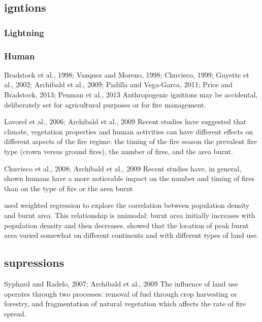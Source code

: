 \subsection{igntions}

\subsubsection{Lightning}

\subsubsection{Human}
Bradstock et al., 1998; Vazquez and
Moreno, 1998; Chuvieco, 1999; Guyette et al., 2002; Archibald et al., 2009; Padilla and
Vega-Garca, 2011; Price and Bradstock, 2013; Penman et al., 2013
Anthropogenic ignitions may be accidental, deliberately set
for agricultural purposes or for fire management. 

Lavorel et al., 2006; Archibald et al., 2009
Recent studies have suggested that climate, vegetation properties and human activities can have different effects on different aspects of the fire regime:      the timing of the fire season
    the prevalent fire type (crown versus ground fires),
    the number of fires,
    and the area burnt. 

Chuvieco et al., 2008; Archibald et al., 2009
Recent studies have, in general, shown humans have a more noticeable impact on the number and timing of fires than on the type of fire or the area burnt

\citet{bistinas2013relationships}
used weighted regression to explore the correlation between population density and burnt area. This relationship is unimodal: burnt area initially increases with population density and then decreases. \citet{bistinas2013relationships} showed that the location of peak burnt area varied somewhat on different continents and with different types of land use.

\subsection{supressions}
Syphard  and  Radelo,  2007;  Archibald  et  al.,  2009
The influence of land use operates through two processes:  removal of fuel through crop harvesting or forestry, and fragmentation of natural vegetation which affects the rate of fire spread.  

